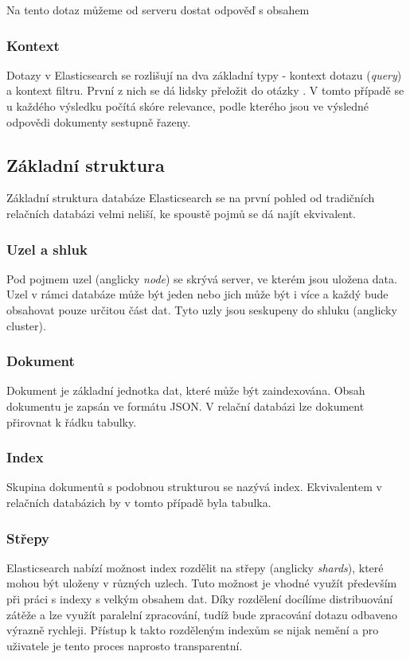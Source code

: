 Na tento dotaz můžeme od serveru dostat odpověď s obsahem

\blindtext

\subsubsection*{Kontext}
Dotazy v Elasticsearch se rozlišují na dva základní typy - kontext dotazu (\emph{query}) a kontext filtru.
První z nich se dá lidsky přeložit do otázky . V tomto případě se u každého výsledku počítá skóre relevance, podle kterého jsou ve výsledné odpovědi dokumenty sestupně řazeny.


\subsection{Základní struktura}
Základní struktura databáze Elasticsearch se na první pohled od tradičních relačních databázi velmi neliší, ke spoustě pojmů se dá najít ekvivalent.

\subsubsection*{Uzel a shluk}
Pod pojmem uzel (anglicky \emph{node}) se skrývá server, ve kterém jsou uložena data. Uzel v rámci databáze může být jeden nebo jich může být i více a každý bude obsahovat pouze určitou část dat. Tyto uzly jsou seskupeny do shluku (anglicky cluster).


\subsubsection*{Dokument}\label{section:dokument}
Dokument je základní jednotka dat, které může být zaindexována. Obsah dokumentu je zapsán ve formátu JSON. V relační databázi lze dokument přirovnat k řádku tabulky.

\subsubsection*{Index}\label{section:index}
Skupina dokumentů s podobnou strukturou se nazývá index. Ekvivalentem v relačních databázich by v tomto případě byla tabulka.

\subsubsection*{Střepy}
Elasticsearch nabízí možnost index rozdělit na střepy (anglicky \emph{shards}), které mohou být uloženy v různých uzlech. Tuto možnost je vhodné využít především při práci s indexy s velkým obsahem dat. Díky rozdělení docílíme distribuování zátěže a lze využít paralelní zpracování, tudíž bude zpracování dotazu odbaveno výrazně rychleji. 
Přístup k takto rozděleným indexům se nijak nemění a pro uživatele je tento proces naprosto transparentní.


